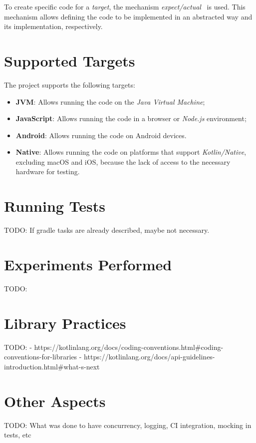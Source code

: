 To create specific code for a \textit{target}, the mechanism \textit{expect/actual}~\cite{kmp-expect-actual} is used.
This mechanism allows defining the code to be implemented in an abstracted way and its implementation, respectively.


\section{Supported Targets}\label{sec:supported-targets}

The project supports the following targets:

\begin{itemize}
    \item \textbf{JVM}: Allows running the code on the \textit{Java Virtual Machine};
    \item \textbf{JavaScript}: Allows running the code in a browser or \textit{Node.js} environment;
    \item \textbf{Android}: Allows running the code on Android devices.
    \item \textbf{Native}: Allows running the code on platforms that support \textit{Kotlin/Native}, excluding macOS and iOS, because the lack of access to the necessary hardware for testing.
\end{itemize}


\section{Running Tests}\label{sec:running-tests}
TODO: If gradle tasks are already described, maybe not necessary.


\section{Experiments Performed}\label{sec:experiments-performed}
TODO:

\section{Library Practices}\label{sec:library-practices}
TODO:
- https://kotlinlang.org/docs/coding-conventions.html#coding-conventions-for-libraries
- https://kotlinlang.org/docs/api-guidelines-introduction.html#what-s-next


\section{Other Aspects}\label{sec:other-aspects}
TODO: What was done to have concurrency, logging, CI integration, mocking in tests, etc

